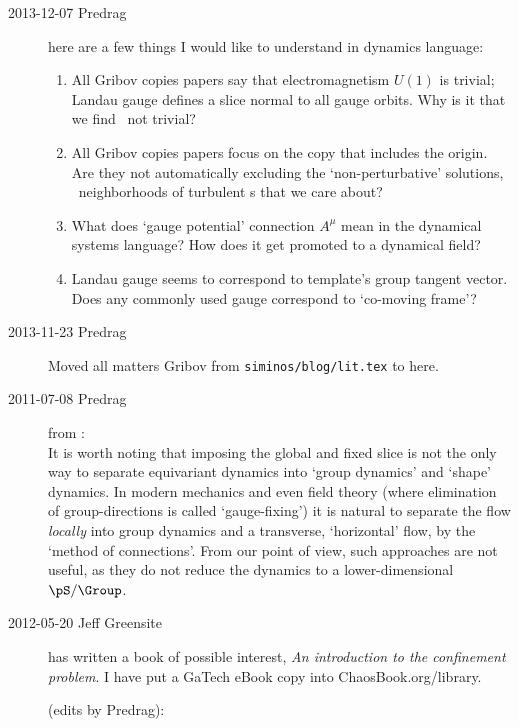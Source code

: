 \begin{description}
\item[2013-12-07  Predrag]
here are a few things I would like to understand in dynamics language:
\begin{enumerate}
  \item All Gribov copies papers say that electromagnetism $U(1)$ is trivial;
  Landau gauge defines a slice normal to all gauge orbits. Why is it that we find
  \ not trivial?
  \item All Gribov copies papers focus on the copy that includes the
  origin. Are they not automatically excluding the `non-perturbative' solutions,
  \ie\ neighborhoods of turbulent \rpo s that we care about?
  \item What does `gauge potential' connection $A^\mu$ mean in the dynamical
  systems language? How does it get promoted to a dynamical field?
  \item Landau gauge seems to correspond to template's group tangent vector.
  Does any commonly used gauge correspond to `co-moving frame'?
\end{enumerate}


\item[2013-11-23  Predrag] Moved all matters Gribov from
\texttt{siminos/blog/lit.tex} to here.

\item[2011-07-08 Predrag] from :                     \toCB
\\
It is worth noting that imposing the global and fixed slice
is not the only way to separate equivariant dynamics into `group
dynamics' and `shape' dynamics. In modern mechanics and even
field theory (where elimination of group-directions is called
`gauge-fixing') it is natural to separate the flow {\em locally} into
group dynamics and a transverse, `horizontal'
flow, by the `method of
connections'. From our point of view, such
approaches are not useful, as they do not reduce the dynamics to a
lower-dimensional \reducedsp\ $\pS/\Group$.


\item[2012-05-20 Jeff Greensite] has written a book of
possible interest, \emph{An introduction to the confinement problem}.
I have put a GaTech eBook copy
 into
ChaosBook.org/library.

(edits by Predrag):


\end{description}
